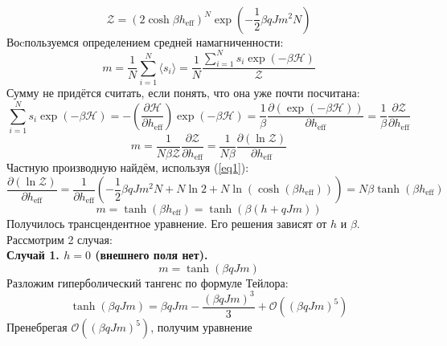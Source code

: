 \documentclass[12pt]{article}
\begin{document}
\begin{enumerate}
\begin{multline*}
    \end{multline*}
    \begin{equation}\label{eq1}
        \boxed{\mathcal{Z}=(2\cosh{\beta h_\text{eff}})^N\exp\left(-\frac{1}{2}\beta qJm^2N\right)}
    \end{equation}
    Воcпользуемся определением средней намагниченности:
    \begin{equation}
        m=\frac{1}{N}\sum\limits_{i=1}^N\langle s_i\rangle=\frac{1}{N}\frac{\sum\limits_{i=1}^N s_i\exp(-\beta\mathcal{H})}{\mathcal{Z}}
    \end{equation}
    Сумму не придётся считать, если понять, что она уже почти посчитана:
    \begin{equation}
        \sum\limits_{i=1}^N s_i\exp(-\beta\mathcal{H})=-\left(\frac{\partial\mathcal{H}}{\partial h_\text{eff}}\right)\exp(-\beta\mathcal{H})=\frac{1}{\beta}\frac{\partial(\exp(-\beta\mathcal{H}))}{\partial h_\text{eff}}=\frac{1}{\beta}\frac{\partial\mathcal{Z}}{\partial h_\text{eff}}
    \end{equation}
    \begin{equation}
        m=\frac{1}{N\beta\mathcal{Z}}\frac{\partial{\mathcal{Z}}}{\partial{h_\text{eff}}}=\frac{1}{N\beta}\frac{\partial(\ln\mathcal{Z})}{\partial{h_\text{eff}}}
    \end{equation}
    Частную производную найдём, используя (\ref{eq1}):
    \begin{equation}
        \frac{\partial(\ln\mathcal{Z})}{\partial{h_\text{eff}}}=\frac{1}{\partial{h_\text{eff}}}\left(-\frac{1}{2}\beta qJm^2N+N\ln 2+N\ln(\cosh(\beta h_\text{eff}))\right)=N\beta\tanh(\beta h_\text{eff})
    \end{equation}
    \begin{equation}\label{eq4}
        m=\tanh(\beta h_\text{eff})=\tanh(\beta(h+qJm))
    \end{equation}
    Получилось трансцендентное уравнение. Его решения зависят от $h$ и $\beta$. Рассмотрим 2 случая:\\
    \textbf{Случай 1. $h=0$ (внешнего поля нет).}\\
    \begin{equation}
        m=\tanh(\beta qJm)
    \end{equation}
    Разложим гиперболический тангенс по формуле Тейлора:
    \begin{equation}
        \tanh(\beta qJm)=\beta qJm-\frac{(\beta qJm)^3}{3}+\mathcal{O}((\beta qJm)^5)
    \end{equation}
    Пренебрегая $\mathcal{O}((\beta qJm)^5)$, получим уравнение

\end{enumerate}
\end{document}
